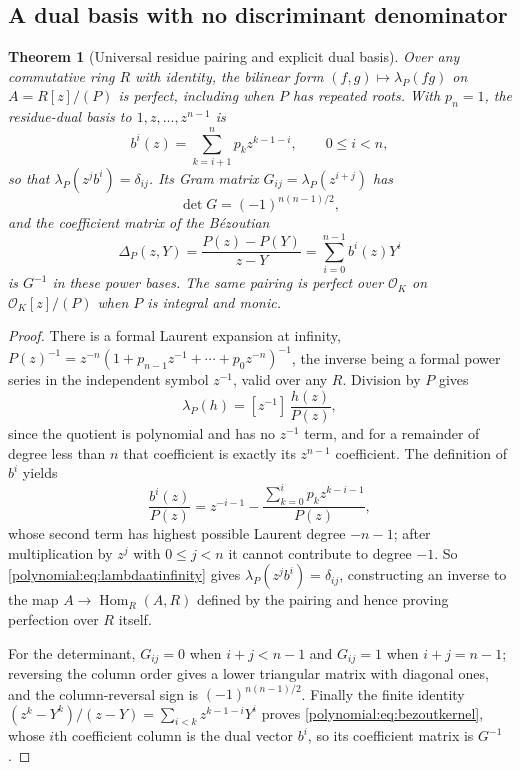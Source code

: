 \documentclass[11pt,letterpaper]{article}
\numberwithin{equation}{section}
\newtheorem{theorem}{Theorem}[section]
\theoremstyle{definition}
\theoremstyle{remark}\newtheorem{remark}[theorem]{Remark}
\newcommand{\OO}{\mathcal O}
\newcommand{\Hom}{\operatorname{Hom}}
\begin{document}
\subsection{A dual basis with no discriminant denominator}
\begin{theorem}[Universal residue pairing and explicit dual basis]
\label{polynomial:thm:residuepairing}
Over any commutative ring $R$ with identity, the bilinear form
$(f,g)\mapsto\lambda_P(fg)$ on $A=R[z]/(P)$ is perfect, including when $P$ has
repeated roots. With $p_n=1$, the residue-dual basis to $1,z,\ldots,z^{n-1}$
is
\begin{equation}\label{polynomial:eq:dualbasis}
 b^i(z)=\sum_{k=i+1}^np_kz^{k-1-i},\qquad 0\le i<n,
\end{equation}
so that $\lambda_P(z^jb^i)=\delta_{ij}$. Its Gram matrix
$G_{ij}=\lambda_P(z^{i+j})$ has
\begin{equation}\label{polynomial:eq:gramdet}
 \det G=(-1)^{n(n-1)/2},
\end{equation}
and the coefficient matrix of the B\'ezoutian
\begin{equation}\label{polynomial:eq:bezoutkernel}
 \Delta_P(z,Y)=\frac{P(z)-P(Y)}{z-Y}=\sum_{i=0}^{n-1}b^i(z)Y^i
\end{equation}
is $G^{-1}$ in these power bases. The same pairing is perfect over $\OO_K$ on
$\OO_K[z]/(P)$ when $P$ is integral and monic.
\end{theorem}
\begin{proof}
There is a formal Laurent expansion at infinity,
$P(z)^{-1}=z^{-n}(1+p_{n-1}z^{-1}+\cdots+p_0z^{-n})^{-1}$, the inverse being a
formal power series in the independent symbol $z^{-1}$, valid over any $R$.
Division by $P$ gives
\begin{equation}\label{polynomial:eq:lambdaatinfinity}
 \lambda_P(h)=[z^{-1}]\,\frac{h(z)}{P(z)} ,
\end{equation}
since the quotient is polynomial and has no $z^{-1}$ term, and for a remainder
of degree less than $n$ that coefficient is exactly its $z^{n-1}$ coefficient.
The definition of $b^i$ yields
\[
 \frac{b^i(z)}{P(z)}=z^{-i-1}-\frac{\sum_{k=0}^ip_kz^{k-i-1}}{P(z)},
\]
whose second term has highest possible Laurent degree $-n-1$; after
multiplication by $z^j$ with $0\le j<n$ it cannot contribute to degree $-1$.
So \eqref{polynomial:eq:lambdaatinfinity} gives
$\lambda_P(z^jb^i)=\delta_{ij}$, constructing an inverse to the map
$A\to\Hom_R(A,R)$ defined by the pairing and hence proving perfection over $R$
itself.

For the determinant, $G_{ij}=0$ when $i+j<n-1$ and $G_{ij}=1$ when
$i+j=n-1$; reversing the column order gives a lower triangular matrix with
diagonal ones, and the column-reversal sign is $(-1)^{n(n-1)/2}$. Finally the
finite identity $(z^k-Y^k)/(z-Y)=\sum_{i<k}z^{k-1-i}Y^i$ proves
\eqref{polynomial:eq:bezoutkernel}, whose $i$th coefficient column is the dual
vector $b^i$, so its coefficient matrix is $G^{-1}$.
\end{proof}
\end{document}
